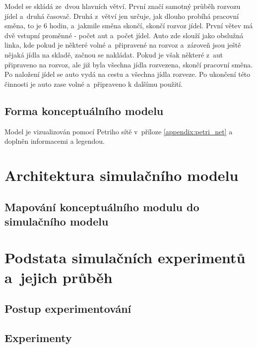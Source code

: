 \documentclass[a4paper, 11pt]{article}
\begin{document}
	Model se skládá ze~dvou hlavních větví. První značí samotný průběh
	rozvozu jídel a~druhá časovač. Druhá z~větví jen určuje, jak dlouho
	probíhá pracovní směna, to je 6 hodin, a~jakmile směna skončí, skončí
	rozvoz jídel. První větev má dvě vstupní proměnné - počet aut a~počet
	jídel. Auto zde slouží jako obslužná linka, kde pokud je některé volné
	a~připravené na rozvoz a~zároveň jsou ještě nějaká jídla na skladě,
	začnou se nakládat. Pokud je však některé z~aut připraveno na rozvoz,
	ale již byla všechna jídla rozvezena, skončí pracovní směna. Po
	naložení jídel se auto vydá na cestu a všechna jídla rozveze. Po ukončení
	této činnosti je auto zase volné a~připraveno k dalšímu použití.


	\subsection{Forma konceptuálního modelu}

	Model je vizualizován pomocí Petriho sítě v~příloze
	\ref{appendix:petri_net} a doplněn informacemi a legendou.



	\section{Architektura simulačního modelu}


	\subsection{Mapování konceptuálního modulu do simulačního modelu}



	\section{Podstata simulačních experimentů a~jejich průběh}


	\subsection{Postup experimentování}


	\subsection{Experimenty}
\end{document}
